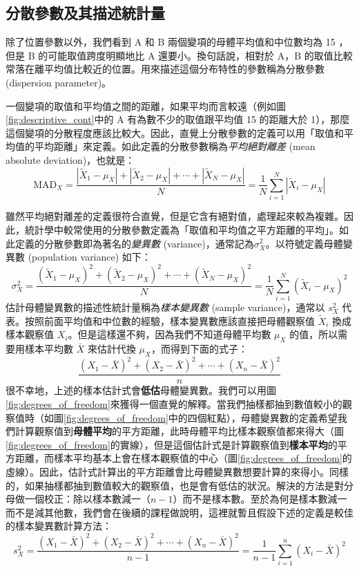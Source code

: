 \subsection{分散參數及其描述統計量}
    除了位置參數以外，我們看到 A 和 B 兩個變項的母體平均值和中位數均為 15 ，但是 B 的可能取值跨度明顯地比 A 還要小。換句話說，相對於 A，B 的取值比較常落在離平均值比較近的位置。用來描述這個分布特性的參數稱為分散參數 (dispersion parameter)。
    
    一個變項的取值和平均值之間的距離，如果平均而言較遠（例如圖\ref{fig:descriptive_cont}中的 A 有為數不少的取值跟平均值 15 的距離大於 1），那麼這個變項的分散程度應該比較大。因此，直覺上分散參數的定義可以用「取值和平均值的平均距離」來定義。如此定義的分散參數稱為\textit{平均絕對離差} (mean absolute deviation)，也就是：
    \[\text{MAD}_X = \frac{|\tilde{X}_1-\mu_X|+|\tilde{X}_2-\mu_X|+\cdots+|\tilde{X}_N-\mu_X|}{N} = \frac{1}{N} \sum_{i=1}^N |\tilde{X}_i-\mu_X|\]

    雖然平均絕對離差的定義很符合直覺，但是它含有絕對值，處理起來較為複雜。因此，統計學中較常使用的分散參數定義為「取值和平均值之平方距離的平均」。如此定義的分散參數即為著名的\textit{變異數} (variance)，通常記為$\sigma^2_X$。以符號定義母體變異數 (population variance) 如下：
    \[\sigma^2_X = \frac{(\tilde{X}_1-\mu_X)^2+(\tilde{X}_2-\mu_X)^2+\cdots+(\tilde{X}_N-\mu_X)^2}{N} = \frac{1}{N} \sum_{i=1}^N (\tilde{X}_i-\mu_X)^2\]
    估計母體變異數的描述性統計量稱為\textit{樣本變異數} (sample variance)，通常以 $s^2_X$ 代表。按照前面平均值和中位數的經驗，樣本變異數應該直接把母體觀察值 $\tilde{X}_i$ 換成樣本觀察值 $X_i$。但是這樣還不夠，因為我們不知道母體平均數 $\mu_X$ 的值，所以需要用樣本平均數 $\bar{X}$ 來估計代換 $\mu_X$，而得到下面的式子：
    \[\frac{(X_1-\bar{X})^2+(X_2-\bar{X})^2+\cdots+(X_n-\bar{X})^2}{n}\]
    很不幸地，上述的樣本估計式會\textbf{低估}母體變異數。我們可以用圖\ref{fig:degrees_of_freedom}來獲得一個直覺的解釋。當我們抽樣都抽到數值較小的觀察值時（如圖\ref{fig:degrees_of_freedom}中的四個紅點），母體變異數的定義希望我們計算觀察值到\textbf{母體平均}的平方距離，此時母體平均比樣本觀察值都來得大（圖\ref{fig:degrees_of_freedom}的實線），但是這個估計式是計算觀察值到\textbf{樣本平均}的平方距離，而樣本平均基本上會在樣本觀察值的中心（圖\ref{fig:degrees_of_freedom}的虛線）。因此，估計式計算出的平方距離會比母體變異數想要計算的來得小。同樣的，如果抽樣都抽到數值較大的觀察值，也是會有低估的狀況。解決的方法是對分母做一個校正：除以樣本數減一（$n-1$）而不是樣本數。至於為何是樣本數減一而不是減其他數，我們會在後續的課程做說明，這裡就暫且假設下述的定義是較佳的樣本變異數計算方法：
    \[s^2_X = \frac{(X_1-\bar{X})^2+(X_2-\bar{X})^2+\cdots+(X_n-\bar{X})^2}{n-1} = \frac{1}{n-1} \sum_{i=1}^n (X_i-\bar{X})^2\]


